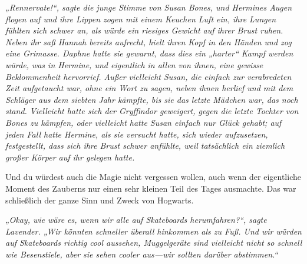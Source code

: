 \emph{„Rennervate!“, sagte die junge Stimme von Susan Bones, und Hermines Augen flogen auf und ihre Lippen zogen mit einem Keuchen Luft ein, ihre Lungen fühlten sich schwer an, als würde ein riesiges Gewicht auf ihrer Brust ruhen. Neben ihr saß Hannah bereits aufrecht, hielt ihren Kopf in den Händen und zog eine Grimasse. Daphne hatte sie gewarnt, dass dies ein „harter“ Kampf werden würde, was in Hermine, und eigentlich in allen von ihnen, eine gewisse Beklommenheit hervorrief. Außer vielleicht Susan, die einfach zur verabredeten Zeit aufgetaucht war, ohne ein Wort zu sagen, neben ihnen herlief und mit dem Schläger aus dem siebten Jahr kämpfte, bis sie das letzte Mädchen war, das noch stand. Vielleicht hatte sich der Gryffindor geweigert, gegen die letzte Tochter von Bones zu kämpfen, oder vielleicht hatte Susan einfach nur Glück gehabt; auf jeden Fall hatte Hermine, als sie versucht hatte, sich wieder aufzusetzen, festgestellt, dass sich ihre Brust schwer anfühlte, weil tatsächlich ein ziemlich großer Körper auf ihr gelegen hatte.}

Und du würdest auch die Magie nicht vergessen wollen, auch wenn der eigentliche Moment des Zauberns nur einen sehr kleinen Teil des Tages ausmachte. Das war schließlich der ganze Sinn und Zweck von Hogwarts.

\emph{„Okay, wie wäre es, wenn wir alle auf Skateboards herumfahren?“, sagte Lavender. „Wir könnten schneller überall hinkommen als zu Fuß. Und wir würden auf Skateboards richtig cool aussehen, Muggelgeräte sind vielleicht nicht so schnell wie Besenstiele, aber sie sehen cooler aus—wir sollten darüber abstimmen.“}

